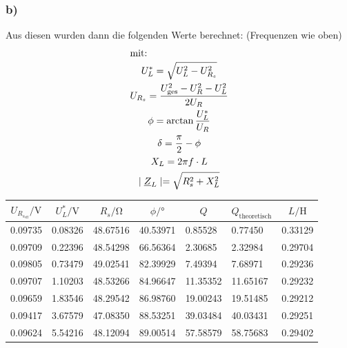 \documentclass[a4paper, 12pt]{article}
\begin{document}
     \subsubsection*{b)}
     \noindent Aus diesen wurden dann die folgenden Werte berechnet: (Frequenzen wie oben)
     \begin{gather*}
       \intertext{mit:}
       U_L^* = \sqrt{U^2_L - U_{R_{s}}^2}\\
       U_{R_{s}} = \frac{U_{\text{ges}}^2 - U_R^2 - U_L^2}{2 U_R}\\
       \phi = \arctan{\frac{U_L^*}{U_R}}\\
       \delta = \frac{\pi}{2} - \phi\\
       X_L = 2 \pi f \cdot L\\
       \mid \underline{Z}_L \mid = \sqrt{R_s^2 + X_L^2}
     \end{gather*}
      \begin{table}[H]
      \begin{center}
      \begin{tabular}{@{}lllllll@{}}
      \toprule
      \multicolumn{1}{c}{$U_{R_{s_{\text{eff}}}}/\si{\volt}$}     & \multicolumn{1}{c}{$U_L^*/\si{\volt}$}     & \multicolumn{1}{c}{$R_s/\si{\ohm}$}   & \multicolumn{1}{c}{$\phi/\si{\degree}$}      & \multicolumn{1}{c}{$Q$}       & \multicolumn{1}{c}{$Q_{\text{theoretisch}}$}   & \multicolumn{1}{c}{$L/\si{\henry}$} \\ \midrule
      0.09735 & 0.08326 & 48.67516 & 40.53971 & 0.85528  & 0.77450  & 0.33129   \\
      0.09709 & 0.22396 & 48.54298 & 66.56364 & 2.30685  & 2.32984  & 0.29704   \\
      0.09805 & 0.73479 & 49.02541 & 82.39929 & 7.49394  & 7.68971  & 0.29236   \\
      0.09707 & 1.10203 & 48.53266 & 84.96647 & 11.35352 & 11.65167 & 0.29232   \\
      0.09659 & 1.83546 & 48.29542 & 86.98760 & 19.00243 & 19.51485 & 0.29212   \\
      0.09417 & 3.67579 & 47.08350 & 88.53251 & 39.03484 & 40.03431 & 0.29251   \\
      0.09624 & 5.54216 & 48.12094 & 89.00514 & 57.58579 & 58.75683 & 0.29402   \\ \bottomrule
      \end{tabular}
      \end{center}
      \end{table}
\end{document}
